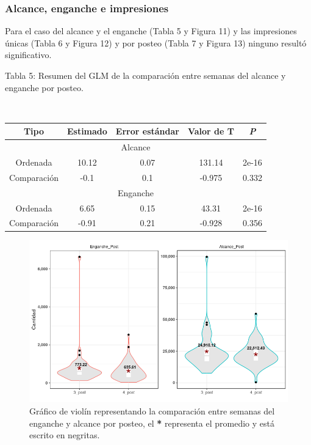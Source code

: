 \documentclass[a4paper,10pt]{article}
\begin{document}
\subsubsection{Alcance, enganche e impresiones}
Para el caso del alcance y el enganche (Tabla 5 y Figura 11) y las 
impresiones únicas (Tabla 6 y Figura 12) y por posteo (Tabla 7 y Figura 13) ninguno
resultó significativo.

\begin{center}
 \caption{Tabla 5: Resumen del GLM de la comparación entre semanas del alcance y enganche por posteo.} \\ [0.3cm]
 {\footnotesize
 \begin{tabular}{c|c|c|c|c}
  \hline 
   Tipo &Estimado & Error estándar & Valor de T & \textit{P} \\
  \hline 
  \multicolumn{5}{c}{Alcance} \\
  \hline
  Ordenada & 10.12 & 0.07 & 131.14 & 2e-16 \\
  Comparación & -0.1 & 0.1 & -0.975 & 0.332 \\
  \hline 
  \multicolumn{5}{c}{Enganche}\\
  \hline
  Ordenada & 6.65 & 0.15 & 43.31 & 2e-16 \\
  Comparación & -0.91 & 0.21 & -0.928 & 0.356 \\
  \hline
  \end{tabular}
 }	    
\end{center}

\begin{figure}[H]
 \begin{center}
  \includegraphics[width=.75\textwidth]{imagenes/graficas/comparacion4.png}
  \caption{Gráfico de violín representando la comparación entre semanas del  enganche y alcance por posteo,
  el \textbf{*} representa el promedio y está escrito en negritas.}
 \end{center}
\end{figure}
\end{document}
